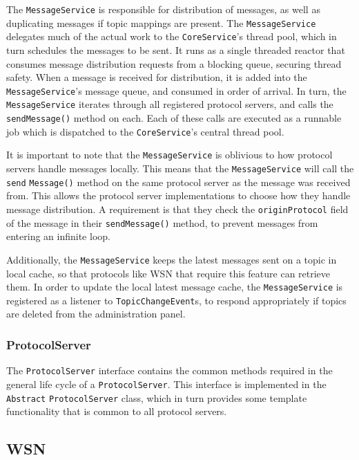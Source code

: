 The \verb!MessageService! is responsible for distribution of messages, as well as duplicating messages if topic mappings are present. The \verb!MessageService! delegates much of the actual work to the \verb!CoreService!'s thread pool, which in turn schedules the messages to be sent. It runs as a single threaded reactor that consumes message distribution requests from a blocking queue, securing thread safety.
When a message is received for distribution, it is added into the \verb!MessageService!'s message queue, and consumed in order of arrival. In turn, the \verb!MessageService! iterates through all registered protocol servers, and calls the \verb!sendMessage()! method on each. Each of these calls are executed as a runnable job which is dispatched to the \verb!CoreService!'s central thread pool.

It is important to note that the \verb!MessageService! is oblivious to how protocol servers handle messages locally. This means that the \verb!MessageService! will call the \verb!send! \verb!Message()! method on the same protocol server as the message was received from. This allows the protocol server implementations to choose how they handle message distribution. A requirement is that they check the \verb!originProtocol! field of the message in their \verb!send!\verb!Message()! method, to prevent messages from entering an infinite loop.

Additionally, the \verb!MessageService! keeps the latest messages sent on a topic in local cache, so that protocols like WSN that require this feature can retrieve them. In order to update the local latest message cache, the \verb!MessageService! is registered as a listener to \verb!TopicChangeEvent!s, to respond appropriately if topics are deleted from the administration panel.

\subsubsection{ProtocolServer}
\label{subsec:architecture_and_implementation-implementation-core-protocolserver}

The \verb!ProtocolServer! interface contains the common methods required in the general life cycle of a \verb!ProtocolServer!. This interface is implemented in the \verb!Abstract! \verb!ProtocolServer! class, which in turn provides some template functionality that is common to all protocol servers.

\subsection{WSN}
\label{subsec:architecture_and_implementation-implementation-wsn}

